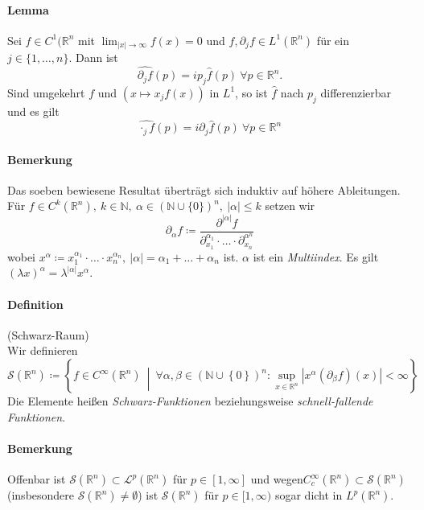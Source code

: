 \documentclass[12pt,a4paper,fleqn]{article}
\def\abs#1{{\left\vert #1 \right\vert}}
\def\set#1{{\left\{ #1 \right\}}}
\def\Mid{\ \middle|\ }
\def\R{{\mathbb{R}}}
\begin{document}
\paragraph{Lemma} Sei $f \in C^1(\mathbb{R}^n$ mit $\lim_{\vert x \vert \rightarrow \infty} f(x) = 0$ und $f, \partial_j f \in L^1(\mathbb{R}^n)$ für ein \mbox{$j \in \{1, \dots, n\}$}. Dann ist
\begin{displaymath}
\widehat{\partial_j f}(p) = ip_j \widehat{f}(p)\ \forall p \in \mathbb{R}^n.
\end{displaymath}
Sind umgekehrt $f$ und $(x \mapsto x_j f(x))$ in $L^1$, so ist $\widehat{f}$ nach $p_j$ differenzierbar und es gilt
\begin{displaymath}
\widehat{\cdot_j f}(p) = i\partial_j\widehat{f}(p)\ \forall p \in \mathbb{R}^n
\end{displaymath}

\paragraph{Bemerkung} Das soeben bewiesene Resultat überträgt sich induktiv auf höhere Ableitungen. Für $f \in C^k(\mathbb{R}^n),\ k \in \mathbb{N},\ \alpha \in (\mathbb{N} \cup \{ 0 \})^n,\ \vert \alpha \vert \leq k$ setzen wir
\begin{displaymath}
\partial_\alpha f \coloneqq \frac{\partial^{\abs{\alpha}}f}{\partial_{x_1}^{\alpha_1}\cdot \dots \cdot \partial_{x_n}^{\alpha^n}}
\end{displaymath}
wobei $x^\alpha \coloneqq x_1^{\alpha_1}\cdot\dots\cdot x_n^{\alpha_n},\ \abs{\alpha} = \alpha_1 + \dots + \alpha_n$ ist. $\alpha$ ist ein \textit{Multiindex}. Es gilt $(\lambda x)^\alpha = \lambda^{\abs{\alpha}}x^\alpha$.

\paragraph{Definition} (Schwarz-Raum)\\
Wir definieren
\begin{displaymath}
\mathscr{S}(\mathbb{R}^n) \coloneqq \set{f \in C^\infty(\mathbb{R}^n) \Mid \forall\alpha, \beta \in (\mathbb{N} \cup \set{0})^n : \sup_{x \in \mathbb{R}^n} \abs{x^\alpha(\partial_\beta f)(x)} < \infty}
\end{displaymath}
Die Elemente heißen \textit{Schwarz-Funktionen} beziehungsweise \textit{schnell-fallende Funktionen}.

\paragraph{Bemerkung} Offenbar ist $\mathscr{S}(\mathbb{R}^n) \subset \mathscr{L}^p(\mathbb{R}^n)$ für $p \in [1, \infty]$ und wegen\linebreak \mbox{$C^\infty_c(\mathbb{R}^n) \subset \mathscr{S}(\R^n)$} (insbesondere $\mathscr{S}(\R^n) \not = \emptyset$) ist $\mathscr{S}(\R^n)$ für $p \in [1, \infty)$ sogar dicht in $L^p(\R^n)$.
\end{document}
